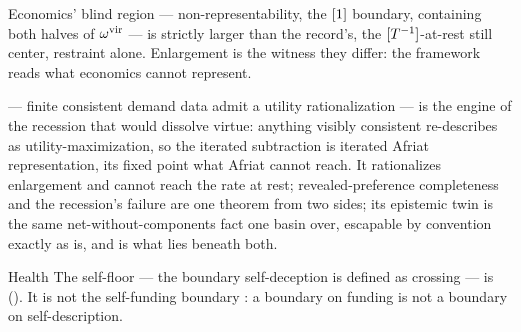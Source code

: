 \documentclass[../main]{subfiles}
\begin{document}
Economics' blind region --- non-representability, the $[1]$ boundary, containing both
halves of $\omega\sp{\mathrm{vir}}$ --- is strictly larger than the record's, the $[T\sp{-1}]$-at-rest still
center, restraint alone. Enlargement is the witness they differ: the framework reads what
economics cannot represent.

\begin{econ}[label=e:afriat, title={Rationalization reaches enlargement, never the rate at rest},
  ref=op:afriat, cites={a:afriat}, departs=annex,
  stopsat={rationalizes any visibly consistent enlargement; cannot reach the rate at rest, and src:nd lies beneath both}]
  \textcite{a:afriat} --- finite consistent demand data admit a utility rationalization --- is
  the engine of the recession that would dissolve virtue: anything visibly consistent
  re-describes as utility-maximization, so the iterated subtraction is iterated Afriat
  representation, its fixed point what Afriat cannot reach. It rationalizes enlargement and
  cannot reach the rate at rest; revealed-preference completeness and the recession's failure
  are one theorem from two sides; its epistemic twin  is the same
  net-without-components fact one basin over, escapable by convention exactly as
   is, and  is what lies beneath both.
\end{econ}

\begin{statement}{}{Health}
  The self-floor --- the boundary self-deception is defined as crossing --- is
   (). It is not the self-funding boundary
  : a boundary on funding is not a boundary on self-description.
\end{statement}

\end{document}
